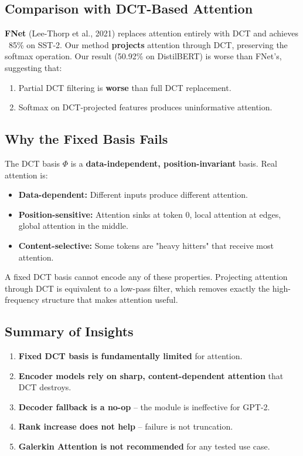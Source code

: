 \subsection{Comparison with DCT-Based Attention}

\textbf{FNet} (Lee-Thorp et al., 2021) replaces attention entirely with DCT 
and achieves ~85\% on SST-2. Our method \textbf{projects} attention through DCT, 
preserving the softmax operation. Our result (50.92\% on DistilBERT) is 
worse than FNet's, suggesting that:

\begin{enumerate}
\item Partial DCT filtering is \textbf{worse} than full DCT replacement.
\item Softmax on DCT-projected features produces uninformative attention.

\end{enumerate}
\subsection{Why the Fixed Basis Fails}

The DCT basis $\Phi$ is a \textbf{data-independent, position-invariant} basis. 
Real attention is:

\begin{itemize}
\item \textbf{Data-dependent:} Different inputs produce different attention.
\item \textbf{Position-sensitive:} Attention sinks at token 0, local attention at
  edges, global attention in the middle.
\item \textbf{Content-selective:} Some tokens are "heavy hitters" that receive
  most attention.

\end{itemize}
A fixed DCT basis cannot encode any of these properties. Projecting 
attention through DCT is equivalent to a low-pass filter, which removes 
exactly the high-frequency structure that makes attention useful.

\subsection{Summary of Insights}

\begin{enumerate}
\item \textbf{Fixed DCT basis is fundamentally limited} for attention.
\item \textbf{Encoder models rely on sharp, content-dependent attention} that DCT
  destroys.
\item \textbf{Decoder fallback is a no-op} -- the module is ineffective for GPT-2.
\item \textbf{Rank increase does not help} -- failure is not truncation.
\item \textbf{Galerkin Attention is not recommended} for any tested use case.

\end{enumerate}
